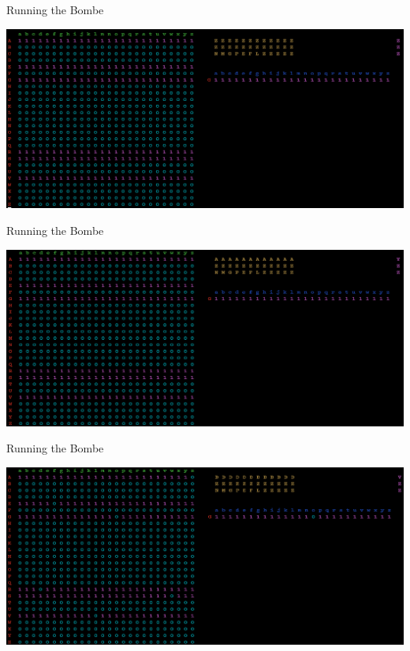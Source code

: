 \documentclass[hyphens,aspectratio=169]{beamer}
\begin{document}
\begin{frame}{Running the Bombe}
\begin{center}
\includegraphics[scale=0.38]{paper/images/bombe_sim_1.png}
\end{center}
\end{frame}


\begin{frame}{Running the Bombe}
\begin{center}
\includegraphics[scale=0.38]{paper/images/bombe_sim_2.png}
\end{center}
\end{frame}


\begin{frame}{Running the Bombe}
\begin{center}
\includegraphics[scale=0.38]{paper/images/bombe_sim_3.png}
\end{center}
\end{frame}
\end{document}
